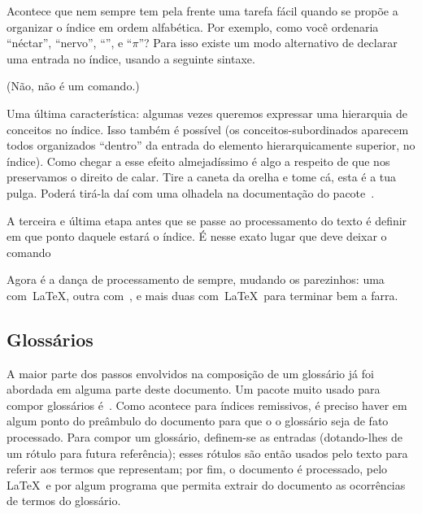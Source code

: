 Acontece que  nem sempre tem pela frente uma
tarefa fácil quando se propõe a organizar o índice em ordem
alfabética. Por exemplo, como você ordenaria ``néctar'', ``nervo'',
``'', e ``$\pi$''? Para isso existe um modo
alternativo de declarar uma entrada no índice, usando a
seguinte sintaxe.

\begin{center}
\end{center}

(Não,  não é um comando.)

Uma última característica: algumas vezes queremos expressar uma
hierarquia de conceitos no índice. Isso também é possível (os
conceitos-subordinados aparecem todos organizados ``dentro'' da
entrada do elemento hierarquicamente superior, no índice). Como chegar
a esse efeito almejadíssimo é algo a respeito de que nos preservamos o
direito de calar. Tire a caneta da orelha e tome cá, esta é a tua
pulga. Poderá tirá-la daí com uma olhadela na documentação do
pacote~.

A terceira e última etapa antes que se passe ao processamento do texto
é definir em que ponto daquele estará o índice. É nesse exato lugar
que deve deixar o comando

\begin{center}
\end{center}

Agora é a dança de processamento de sempre, mudando os parezinhos: uma
com~\LaTeX, outra com~\programa, e mais duas com~\LaTeX\ para terminar
bem a farra.

\subsection{Glossários}

A maior parte dos passos envolvidos na composição de um glossário já
foi abordada em alguma parte deste documento. Um pacote muito usado
para compor glossários é~. Como acontece para
índices remissivos, é preciso haver  em
algum ponto do preâmbulo do documento para que o o glossário seja de
fato processado. Para compor um glossário, definem-se as entradas
(dotando-lhes de um rótulo para futura referência); esses rótulos são
então usados pelo texto para referir aos termos que representam; por
fim, o documento é processado, pelo \LaTeX\ e por algum programa que
permita extrair do documento as ocorrências de termos do glossário.

